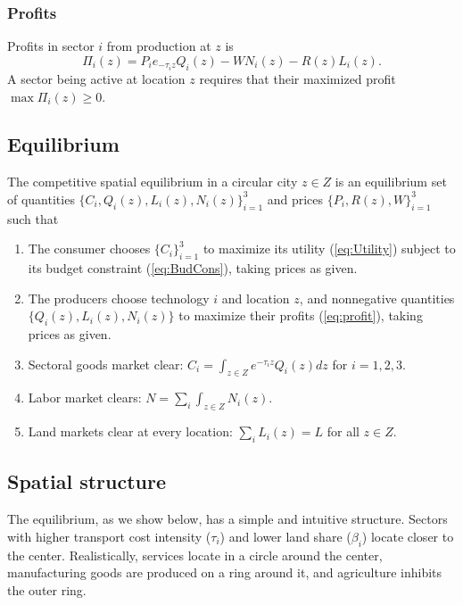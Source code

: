 \documentclass[12pt]{article}
\begin{document}
\subsubsection{Profits}
Profits in sector $i$ from production at $z$ is
\begin{equation}
\label{eq:profit}
\Pi_i(z)=P_ie_{-\tau_iz}Q_i(z)-WN_i(z)-R(z)L_i(z).
\end{equation}
A sector being active at location $z$ requires that their maximized profit $\max\Pi_i(z)\geq0.$

\subsection{Equilibrium}

The competitive spatial equilibrium in a circular city $z\in Z$ is an equilibrium set of quantities $\{C_i, Q_i(z), L_i(z), N_i(z)\}_{i=1}^3$ and prices $\{P_i, R(z), W\}_{i=1}^3$ such that
\begin{enumerate}
    \item The consumer chooses $\{C_i\}_{i=1}^3$ to maximize its utility (\ref{eq:Utility}) subject to its budget constraint (\ref{eq:BudCons}), taking prices as given.
    \item The producers choose technology $i$ and location $z$, and nonnegative quantities $\{Q_i(z), L_i(z), N_i(z)\}$ to maximize their profits (\ref{eq:profit}), taking prices as given.
    \item Sectoral goods market clear: $C_i=\int_{z\in Z} e^{-\tau_iz}Q_i(z)dz$ for $i=1,2,3$.
    \item Labor market clears: $N=\sum_i\int_{z\in Z} N_i(z)$.
    \item Land markets clear at every location: $\sum_iL_i(z)=L$ for all $z\in Z$.
\end{enumerate}

\subsection{Spatial structure}
The equilibrium, as we show below, has a simple and intuitive structure. Sectors with higher transport cost intensity ($\tau_i$) and lower land share ($\beta_i$) locate closer to the center. Realistically, services locate in a circle around the center, manufacturing goods are produced on a ring around it, and agriculture inhibits the outer ring.
\end{document}
